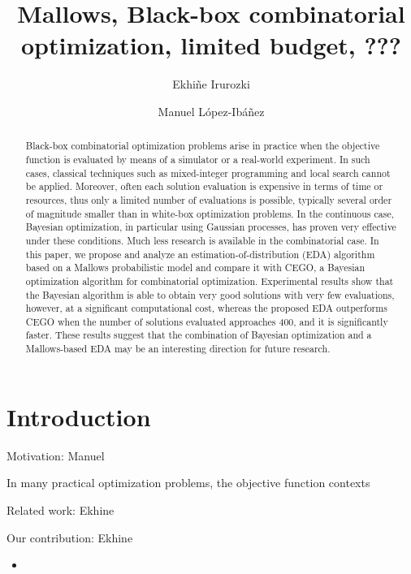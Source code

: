 \documentclass[runningheads]{llncs}
\title{Mallows, Black-box combinatorial optimization, limited budget,  ???}
\author{Ekhiñe Irurozki\inst{1} \and Manuel López-Ibáñez\inst{2}\orcidID{0000-0001-9974-1295}}
\institute{
   Basque Center for Applied Mathematics\\
   \email{eirurozki@bcamath.org}
   \and
   University of Málaga, Málaga, Spain\\
   \email{manuel.lopez-ibanez@uma.es}
}
\date{}%
\begin{document}
\maketitle

\begin{abstract}
  Black-box combinatorial optimization problems arise in practice when the
  objective function is evaluated by means of a simulator or a real-world
  experiment. In such cases, classical techniques such as mixed-integer
  programming and local search cannot be applied. Moreover, often each solution
  evaluation is expensive in terms of time or resources, thus only a limited
  number of evaluations is possible, typically several order of magnitude
  smaller than in white-box optimization problems. In the continuous case,
  Bayesian optimization, in particular using Gaussian processes, has proven
  very effective under these conditions. Much less research is available in the
  combinatorial case. In this paper, we propose and analyze an
  estimation-of-distribution (EDA) algorithm based on a Mallows probabilistic
  model and compare it with CEGO, a Bayesian optimization algorithm for
  combinatorial optimization. Experimental results show that the Bayesian
  algorithm is able to obtain very good solutions with very few evaluations,
  however, at a significant computational cost, whereas the proposed EDA
  outperforms CEGO when the number of solutions evaluated approaches 400, and
  it is significantly faster. These results suggest that the combination of
  Bayesian optimization and a Mallows-based EDA may be an interesting direction
  for future research.

\end{abstract}

\section{Introduction}

Motivation: Manuel

In many practical optimization problems, the objective function contexts

Related work: Ekhine

Our contribution: Ekhine
\begin{itemize}
\item 
\end{itemize}
\end{document}
